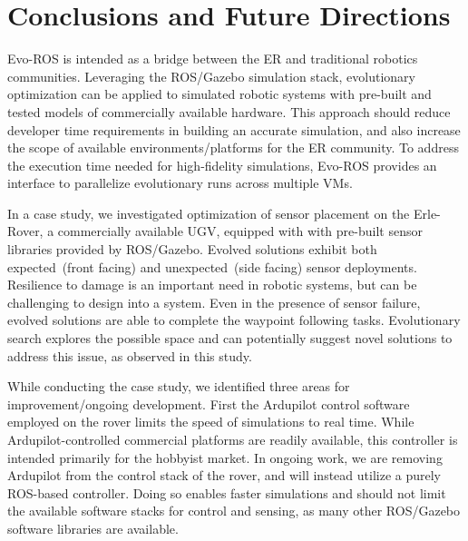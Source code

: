 \section{Conclusions and Future Directions}
\label{s:conclusions}

Evo-ROS is intended as a bridge between the ER and traditional robotics communities.  
%
Leveraging the ROS/Gazebo simulation stack, evolutionary optimization can be applied to simulated robotic systems with pre-built and tested models of commercially available hardware.  
%
This approach should reduce developer time requirements in building an accurate simulation, and also increase the scope of available environments/platforms for the ER community.  
To address the execution time needed for high-fidelity simulations,
Evo-ROS provides an interface to parallelize evolutionary runs across multiple VMs.%

In a case study, we investigated optimization of sensor placement on the Erle-Rover, a commercially available UGV, equipped with with pre-built sensor libraries provided by ROS/Gazebo.  
Evolved solutions exhibit both expected~(front facing) and unexpected~(side facing) sensor deployments.  
%
%
Resilience to damage is an important need in robotic systems, but can be challenging to design into a system.  
%
Even in the presence of sensor failure, evolved solutions are able to complete the waypoint following tasks.  
%
Evolutionary search explores the possible space and can potentially suggest novel solutions to address this issue, as observed in this study.

%
%
%

While conducting the case study, we identified three areas for improvement/ongoing development.
First the Ardupilot control software employed on the rover limits the speed of simulations to real time.  
%
While Ardupilot-controlled commercial platforms are readily available, this controller is
intended primarily for the hobbyist market.  
%
In ongoing work, we are removing Ardupilot from the control stack of the rover, and will instead utilize a purely ROS-based controller.  
%
Doing so enables faster simulations and 
should not limit the available software stacks for control and sensing, 
as many other ROS/Gazebo software libraries are available. 

